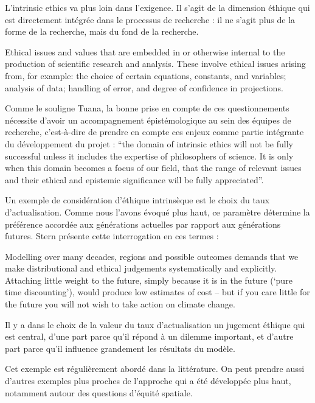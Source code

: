L'\gls{intrinsic ethics} va plus loin dans l'exigence. Il s'agit de la dimension éthique qui est directement intégrée dans le processus de recherche : il ne s'agit plus de la forme de la recherche, mais du fond de la recherche. 

\begin{authoredquote}
Ethical issues and values that are embedded in or otherwise internal to the production of scientific research and analysis. These involve ethical issues arising from, for example: the choice of certain equations, constants, and variables; analysis of data; handling of error, and degree of confidence in projections.
\end{authoredquote}

Comme le souligne Tuana, la bonne prise en compte de ces questionnements nécessite d'avoir un accompagnement épistémologique au sein des équipes de recherche, c'est-à-dire de prendre en compte ces enjeux comme partie intégrante du développement du projet : \enquote{the domain of intrinsic ethics will not be fully successful unless it includes the expertise of philosophers of science. It is only when this domain becomes a focus of our field, that the range of relevant issues and their ethical and epistemic significance will be fully appreciated}. 


Un exemple de considération d'éthique intrinsèque est le choix du taux d'actualisation. Comme nous l'avons évoqué plus haut, ce paramètre détermine la préférence accordée aux générations actuelles par rapport aux générations futures. Stern présente cette interrogation en ces termes : 

\begin{authoredquote}
Modelling over many decades, regions and possible outcomes demands that we make distributional and ethical judgements systematically and explicitly. Attaching little weight to the future, simply because it is in the future (‘pure time discounting’), would produce low estimates of cost – but if you care little for the future you will not wish to take action on climate change.
\end{authoredquote}

Il y a dans le choix de la valeur du taux d'actualisation un jugement éthique qui est central, d'une part parce qu'il répond à un dilemme important, et d'autre part parce qu'il influence grandement les résultats du modèle. 

Cet exemple est régulièrement abordé dans la littérature. On peut prendre aussi d'autres exemples plus proches de l'approche qui a été développée plus haut, notamment autour des questions d'équité spatiale. 

